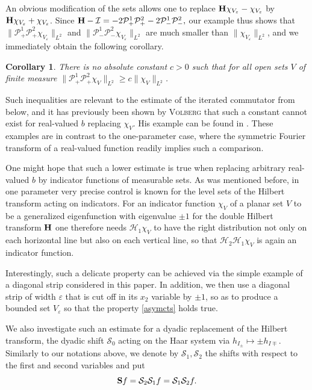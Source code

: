 \documentclass{article}
\newcommand{\tmname}[1]{\textsc{#1}}
\newtheorem{corollary}{Corollary}[theorem]
\def\H{{\bf H}}
\def\S{{\bf S}}
\begin{document}
	An obvious modification of the sets allows one to replace $\H \chi_{V_{\varepsilon}} - \chi_{V_{\varepsilon}}$ by
	$\H \chi_{V_{\varepsilon}} + \chi_{V_{\varepsilon}}$.
	Since
	$\H -\mathcal{I}
	= - 2\mathcal{P}^1_+
	\mathcal{P}^2_+ - 2\mathcal{P}^1_- \mathcal{P}^2_-,$
	our example thus shows
	that $\| \mathcal{P}^1_+ \mathcal{P}^2_+ \chi_{V_{\varepsilon}} \|_{L^2}$ and
	$\| \mathcal{P}^1_- \mathcal{P}^2_- \chi_{V_{\varepsilon}} \|_{L^2}$ are much
	smaller than $\| \chi_{V_{\varepsilon}} \|_{L^2}$, and we immediately obtain the following corollary.


	\begin{corollary}
		There is no
		absolute constant $c>0$ such that for all open sets $V$ of finite measure $\|
		\mathcal{P}^1_+ \mathcal{P}^2_+ \chi_V \|_{L^2} \geqslant c \| \chi_V
		\|_{L^2}$.
	\end{corollary}



	Such inequalities are relevant to the estimate of the iterated commutator
	from below, and it has previously been shown by {\tmname{Volberg}} that such
	a constant cannot exist for real-valued $b$ replacing $\chi_V$. His example can
	be found in \cite{Vo}.
	These examples are in contrast to the one-parameter case,
	where the symmetric Fourier transform of a real-valued function readily
	implies such a comparison.

	One might hope that such a lower estimate is true when replacing arbitrary real-valued $b$ by indicator functions of measurable sets. As was mentioned before, in one parameter
	very precise control is known for the level sets of the Hilbert transform
	acting on indicators.
	For an indicator function $\chi_V$ of a planar set $V$ to be a generalized
	eigenfunction with eigenvalue $\pm 1$ for the double Hilbert transform
	$\H$ one therefore needs $\mathcal{H}_1
	\chi_V$ to have the right distribution not only on each horizontal line but also
	on each vertical line, so that $\mathcal{H}_2\mathcal{H}_1 \chi_V$ is again an
	indicator function.

	Interestingly, such a delicate property can be achieved
	via the simple example of a diagonal strip considered in this paper. In
	addition, we then use a diagonal strip of width $\varepsilon$ that is cut off
	in its $x_2$ variable by $\pm 1$, so as to produce a bounded set $V_{\varepsilon}$
	so that the property \eqref{asymcts} holds true.

	We also investigate such an estimate for a dyadic replacement of the
	Hilbert transform, the dyadic shift $\mathcal{S}_0$ acting on the Haar system
	via $h_{I_{\pm}} \mapsto \pm h_{I \mp}$.
	Similarly to our notations above, we denote by $\mathcal{S}_1 ,\mathcal{S}_2 $ the shifts with respect to the first and second variables and put
	$$ \S f=\mathcal{S}_2 \mathcal{S}_1 f =\mathcal{S}_1 \mathcal{S}_2 f.$$
\end{document}

